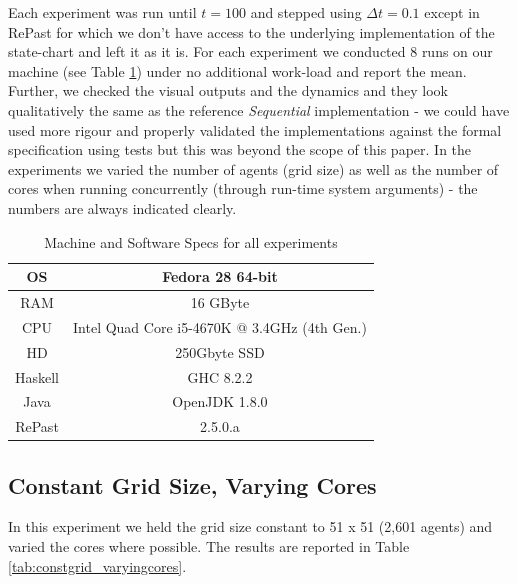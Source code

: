 Each experiment was run until $t = 100$ and stepped using $\Delta t = 0.1$ except in RePast for which we don't have access to the underlying implementation of the state-chart and left it as it is. For each experiment we conducted 8 runs on our machine (see Table \ref{tab:machine_specs}) under no additional work-load and report the mean. Further, we checked the visual outputs and the dynamics and they look qualitatively the same as the reference \textit{Sequential} implementation \cite{thaler_pure_2019} - we could have used more rigour and properly validated the implementations against the formal specification using tests but this was beyond the scope of this paper. In the experiments we varied the number of agents (grid size) as well as the number of cores when running concurrently (through run-time system arguments) - the numbers are always indicated clearly. %

\begin{table}
	\centering
	\begin{tabular}{ c || c }
		OS & Fedora 28 64-bit \\ \hline
		RAM & 16 GByte \\ \hline
		CPU & Intel Quad Core i5-4670K @ 3.4GHz (4th Gen.) \\ \hline
		HD & 250Gbyte SSD \\ \hline
		Haskell & GHC 8.2.2 \\ \hline
		Java & OpenJDK 1.8.0 \\ \hline
		RePast & 2.5.0.a
	\end{tabular}
	
	\caption{Machine and Software Specs for all experiments}
	\label{tab:machine_specs}
\end{table}

\subsection{Constant Grid Size, Varying Cores}
In this experiment we held the grid size constant to 51 x 51 (2,601 agents) and varied the cores where possible. The results are reported in Table \ref{tab:constgrid_varyingcores}.

